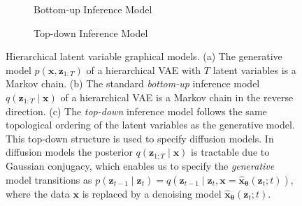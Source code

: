 \begin{figure}[!t]
\begin{subfigure}{.32\columnwidth}
        \caption{Bottom-up Inference Model}
    \end{subfigure}
    \hfill
    \begin{subfigure}{.32\columnwidth}
        \centering
        \caption{Top-down Inference Model}
    \end{subfigure}
    \hfill
    \caption{Hierarchical latent variable graphical models. (a) The generative model $p(\mathbf{x}, \mathbf{z}_{1:T})$ of a hierarchical VAE with $T$ latent variables is a Markov chain. (b) The standard \textit{bottom-up} inference model $q(\mathbf{z}_{1:T} \mid \mathbf{x})$ of a hierarchical VAE is a Markov chain in the reverse direction. (c) The \textit{top-down} inference model follows the same topological ordering of the latent variables as the generative model. This top-down structure is used to specify diffusion models. In diffusion models the posterior $q(\mathbf{z}_{1:T} \mid \mathbf{x})$ is tractable due to Gaussian conjugacy, which enables us to specify the \textit{generative} model transitions as $p(\mathbf{z}_{t-1} \mid \mathbf{z}_{t}) = q(\mathbf{z}_{t-1} \mid \mathbf{z}_{t}, \mathbf{x} = \hat{\mathbf{x}}_{\boldsymbol{\theta}}(\mathbf{z}_t; t))$,  where the data $\mathbf{x}$ is replaced by a denoising model $\hat{\mathbf{x}}_{\boldsymbol{\theta}}(\mathbf{z}_t; t)$.
    }
    \label{fig: hvae}
\end{figure}

